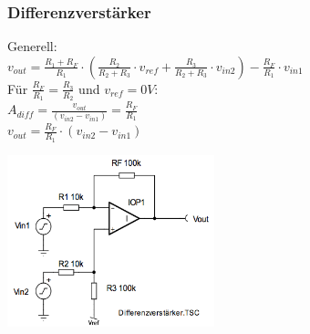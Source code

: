 		\subsubsection{Differenzverstärker}
			\begin{minipage}[b]{12cm}
				Generell: \\
				$v_{out} = \frac{R_1+R_F}{R_1} \cdot (\frac{R_2}{R_2+R_3} \cdot v_{ref} + 
				\frac{R_3}{R_2+R_3} \cdot v_{in2}) - \frac{R_F}{R_1} \cdot v_{in1} $ 
				\bigskip \\
				Für $\frac{R_F}{R_1}=\frac{R_3}{R_2}$ und $v_{ref}=0V$:
				\smallskip \\
            	$A_{diff}=\frac{v_{out}}{(v_{in2}-v_{in1})}=\frac{R_F}{R_1}$\\
            	$v_{out} = \frac{R_F}{R_1}\cdot (v_{in2}-v_{in1})$\\
            \end{minipage}
			\begin{minipage}[c]{6cm}
            	\includegraphics[width=6cm]{./images/differenzver.png}
            \end{minipage}\\

